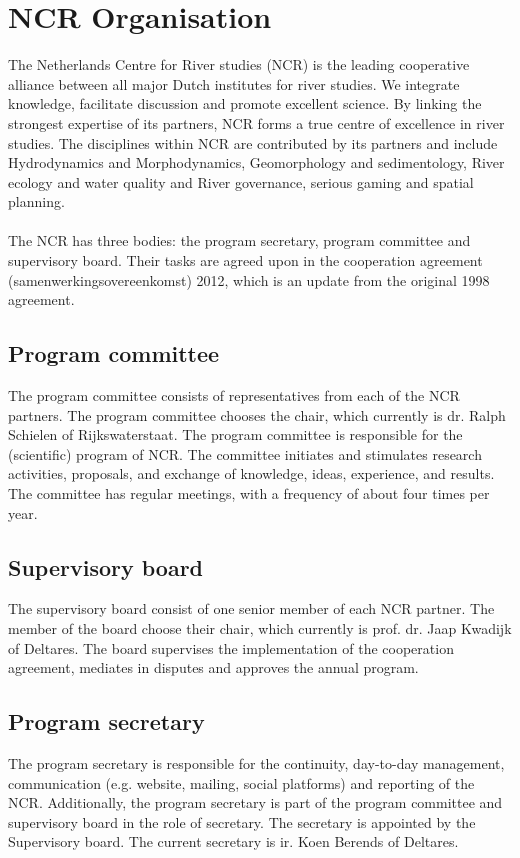 \chapter{NCR Organisation}
The Netherlands Centre for River studies (NCR) is the leading cooperative alliance between all major Dutch institutes for river studies. We integrate knowledge,  facilitate discussion and promote excellent science. By linking the strongest expertise of its partners, NCR forms a true centre of excellence in river studies. The disciplines within NCR are contributed by its partners and include Hydrodynamics and Morphodynamics, Geomorphology and sedimentology, River ecology and water quality and River governance, serious gaming and spatial planning.\\
\\
The NCR has three bodies: the program secretary, program committee and supervisory board. Their tasks are agreed upon in the cooperation agreement (samenwerkingsovereenkomst) 2012, which is an update from the original 1998 agreement.\\
    
    \section{Program committee}
    The program committee consists of representatives from each of the NCR partners. The program committee chooses the chair, which currently is dr. Ralph Schielen of Rijkswaterstaat. The program committee is responsible for the (scientific) program of NCR. The committee initiates and stimulates research activities, proposals, and exchange of knowledge, ideas, experience, and results. The committee has regular meetings, with a frequency of about four times per year.\\ 
    
    \section{Supervisory board}
    The supervisory board consist of one senior member of each NCR partner. The member of the board choose their chair, which currently is prof. dr. Jaap Kwadijk of Deltares. The board supervises the implementation of the cooperation agreement, mediates in disputes and approves the annual program.\\ 
    
    \section{Program secretary}
    The program secretary is responsible for the continuity,  day-to-day management, communication (e.g. website, mailing, social platforms) and reporting of the NCR. Additionally, the program secretary is part of the program committee and supervisory board in the role of secretary. The secretary is appointed by the Supervisory board. The current secretary is ir. Koen Berends of Deltares.

